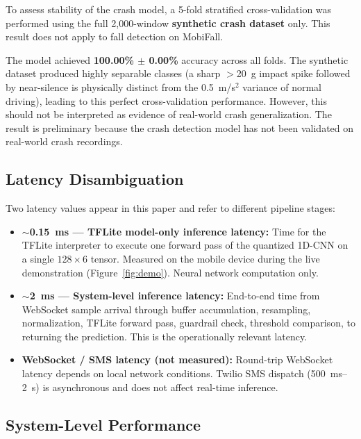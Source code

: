 \documentclass[12pt,a4paper]{article}
\begin{document}
To assess stability of the crash model, a 5-fold stratified
cross-validation was performed using the full 2,000-window
\textbf{synthetic crash dataset} only. This result does not apply to
fall detection on MobiFall.

The model achieved \textbf{100.00\% $\pm$ 0.00\%} accuracy across all folds.
The synthetic dataset produced highly separable classes (a sharp $>$20~g
impact spike followed by near-silence is physically distinct from the
0.5~m/s$^2$ variance of normal driving), leading to this perfect
cross-validation performance. However, this should not be interpreted as
evidence of real-world crash generalization. The result is preliminary
because the crash detection model has not been validated on real-world
crash recordings.

\subsection{Latency Disambiguation}
\label{sec:latency}

Two latency values appear in this paper and refer to different pipeline stages:
\begin{itemize}
  \item \textbf{$\sim$0.15~ms --- TFLite model-only inference latency:}
        Time for the TFLite interpreter to execute one forward pass of the
        quantized 1D-CNN on a single $128\times6$ tensor. Measured on the
        mobile device during the live demonstration (Figure~\ref{fig:demo}).
        Neural network computation only.
  \item \textbf{$\sim$2~ms --- System-level inference latency:}
        End-to-end time from WebSocket sample arrival through buffer
        accumulation, resampling, normalization, TFLite forward pass,
        guardrail check, threshold comparison, to returning the prediction.
        This is the operationally relevant latency.
  \item \textbf{WebSocket / SMS latency (not measured):} Round-trip WebSocket
        latency depends on local network conditions. Twilio SMS dispatch
        (500~ms--2~s) is asynchronous and does not affect real-time inference.
\end{itemize}

\subsection{System-Level Performance}
\end{document}

